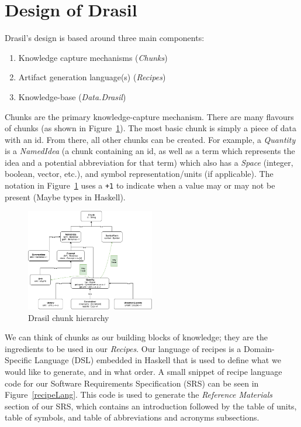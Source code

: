\documentclass[sigconf]{acmart}
\begin{document}
\section{Design of Drasil} \label{SecDesign}

Drasil's design is based around three main components:
\begin{enumerate}
	\item Knowledge capture mechanisms (\textit{Chunks})
	\item Artifact generation language(s) (\textit{Recipes})
	\item Knowledge-base (\textit{Data.Drasil})
\end{enumerate}

Chunks are the primary knowledge-capture mechanism. There are many flavours of 
chunks (as shown in Figure~\ref{hierarchy}). The most basic chunk is simply a 
piece of data with an id. From there, all other chunks can be created. For 
example, a \textit{Quantity} is a \textit{NamedIdea} (a chunk containing an id, 
as well as a term which represents the idea and a potential abbreviation for 
that term) which also has a \textit{Space} (integer, boolean, vector, etc.), 
and symbol representation/units (if applicable).  The notation in
Figure~\ref{hierarchy} uses a \verb|+1| to indicate when a value may or
may not be present (Maybe types in Haskell).

\begin{figure}
	\centering
	\includegraphics[width=0.5\textwidth]{figures/class_hierarchy.png}
	\caption{Drasil chunk hierarchy}
	\label{hierarchy}
\end{figure}

We can think of chunks as our building blocks of knowledge; they are the 
ingredients to be used in our \textit{Recipes}. Our language of recipes is a 
Domain-Specific Language (DSL) embedded in Haskell that is used to define what 
we would like to generate, and in what order. A small snippet of recipe 
language code for our Software Requirements Specification (SRS) can be seen in 
Figure~\ref{recipeLang}. This code is used to generate the \textit{Reference 
Materials} section of our SRS, which contains an introduction followed by the 
table of units, table of symbols, and table of abbreviations and acronyms 
subsections.
\end{document}

